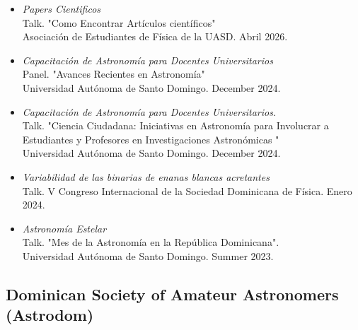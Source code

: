\documentclass[letterpaper,10pt]{article}
\begin{document}
\begin{itemize}[label=$\blacktriangleright$]


\item \textit{Papers Cientificos}\\
Talk. "Como Encontrar Art\'iculos cient\'ificos" \\Asociaci\'on de Estudiantes de F\'isica de la UASD. Abril 2026.


\item \textit{Capacitaci\'on de Astronom\'ia para Docentes Universitarios}\\
Panel. "Avances Recientes en Astronom\'ia" \\Universidad Aut\'onoma de Santo Domingo. December 2024.


\item \textit{Capacitaci\'on de Astronom\'ia para Docentes Universitarios}.\\
Talk. "Ciencia Ciudadana: Iniciativas en Astronom\'ia para Involucrar a Estudiantes y Profesores en Investigaciones Astron\'omicas
" \\Universidad Aut\'onoma de Santo Domingo. December 2024.

\item \textit{Variabilidad de las binarias de enanas blancas acretantes} \\ Talk. V Congreso Internacional de la Sociedad Dominicana de F\'isica. Enero 2024.

\item \textit{Astronom\'ia Estelar} \\
Talk. "Mes de la Astronom\'ia en la Rep\'ublica Dominicana". \\Universidad Aut\'onoma de Santo Domingo. Summer 2023.
\end{itemize}



\subsection*{Dominican Society of Amateur Astronomers (Astrodom)}
\end{document}
